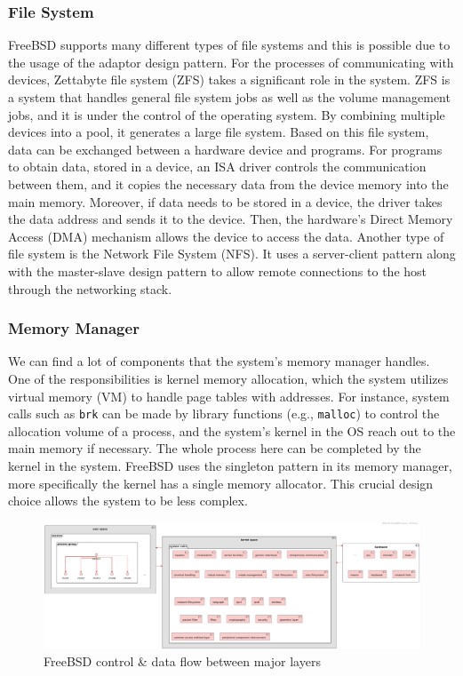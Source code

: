 \documentclass[12pt, dvipsnames, a4paper]{article}
\newcommand{\code}[1]{\texttt{#1}}
\begin{document}
\subsubsection{File System}
FreeBSD supports many different types of file systems and this is possible due to the usage of the adaptor design pattern. For the processes of communicating with devices, Zettabyte file system (ZFS) takes a significant role in the system. ZFS is a system that handles general file system jobs as well as the volume management jobs, and it is under the control of the operating system. By combining multiple devices into a pool, it generates a large file system. Based on this file system, data can be exchanged between a hardware device and programs. For programs to obtain data, stored in a device, an ISA driver controls the communication between them, and it copies the necessary data from the device memory into the main memory. Moreover, if data needs to be stored in a device, the driver takes the data address and sends it to the device. Then, the hardware's Direct Memory Access (DMA) mechanism allows the device to access the data. Another type of file system is the Network File System (NFS). It uses a server-client pattern along with the master-slave design pattern to allow remote connections to the host through the networking stack.\par
\subsubsection{Memory Manager}
We can find a lot of components that the system's memory manager handles. One of the responsibilities is kernel memory allocation, which the system utilizes virtual memory (VM) to handle page tables with addresses. For instance, system calls such as \code{brk} can be made by library functions (e.g., \code{malloc}) to control the allocation volume of a process, and the system's kernel in the OS reach out to the main memory if necessary. The whole process here can be completed by the kernel in the system. FreeBSD uses the singleton pattern in its memory manager, more specifically the kernel has a single memory allocator. This crucial design choice allows the system to be less complex.\par
\begin{figure}[!htb]
	\centering
	\includegraphics[width = 550pt]{assets/system_diagrams/kernel-organization.pdf}
	\caption{FreeBSD control \& data flow between major layers \cite{design}}
\end{figure}
\clearpage
\end{document}
